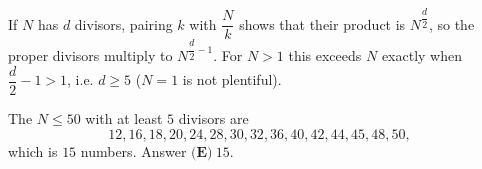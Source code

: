 If $N$ has $d$ divisors, pairing $k$ with $\dfrac Nk$ shows that their product is $N^{\dfrac d2}$, so the proper divisors multiply to $N^{\dfrac d2-1}$. For $N>1$ this exceeds $N$ exactly when $\dfrac d2-1>1$, i.e. $d\ge5$ ($N=1$ is not plentiful).

The $N\le50$ with at least $5$ divisors are
\[12,16,18,20,24,28,30,32,36,40,42,44,45,48,50,\]
which is $15$ numbers. Answer $\boxed{\textbf{(E)}\ 15}$.
